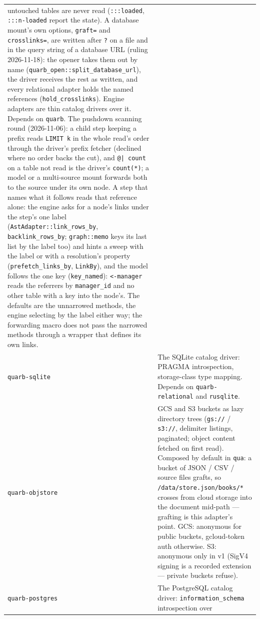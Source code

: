 \documentclass{report}
\begin{document}
\begin{xltabular}{\textwidth}{l X}
  untouched tables are never read (\texttt{:::loaded},
  \texttt{:::n-loaded} report the state). A database mount's own
  options, \texttt{graft=} and \texttt{crosslinks=}, are written
  after \texttt{?} on a file and in the query string of a database
  URL (ruling 2026-11-18): the opener takes them out by name
  (\texttt{quarb\_open::split\_database\_url}), the driver receives
  the rest as written, and every relational adapter holds the
  named references (\texttt{hold\_crosslinks}). Engine
  adapters are thin catalog drivers over it. Depends on
  \texttt{quarb}. The pushdown scanning round (2026-11-06): a child step keeping
  a prefix reads \texttt{LIMIT k} in the whole read's order
  through the driver's prefix fetcher (declined where no order
  backs the cut), and \texttt{@| count} on a table not read is
  the driver's \texttt{count(*)}; a model or a multi-source
  mount forwards both to the source under its own node. A step
  that names what it follows reads that reference alone: the
  engine asks for a node's links under the step's one label
  (\texttt{AstAdapter::link\_rows\_by},
  \texttt{backlink\_rows\_by}; \texttt{graph::memo} keys its last
  list by the label too) and hints a sweep with the label or with
  a resolution's property (\texttt{prefetch\_links\_by},
  \texttt{LinkBy}), and the model follows the one key
  (\texttt{key\_named}): \texttt{<-manager} reads the referrers
  by \texttt{manager\_id} and no other table with a key into the
  node's. The defaults are the unnarrowed methods, the engine
  selecting by the label either way; the forwarding macro does not
  pass the narrowed methods through a wrapper that defines its own
  links. \\
\texttt{quarb-sqlite} & The SQLite catalog driver: PRAGMA
  introspection, storage-class type mapping. Depends on
  \texttt{quarb-relational} and \texttt{rusqlite}. \\
\texttt{quarb-objstore} & GCS and S3 buckets as lazy
  directory trees (\texttt{gs://} / \texttt{s3://}, delimiter
  listings, paginated; object content fetched on first read).
  Composed by default in \texttt{qua}: a bucket of JSON / CSV /
  source files grafts, so \texttt{/data/store.json/books/*}
  crosses from cloud storage into the document mid-path —
  grafting is this adapter's point. GCS: anonymous for public
  buckets, gcloud-token auth otherwise. S3: anonymous only in
  v1 (SigV4 signing is a recorded extension — private buckets
  refuse). \\
\texttt{quarb-postgres} & The PostgreSQL catalog driver:
  \texttt{information\_schema} introspection over

\end{xltabular}
\end{document}
